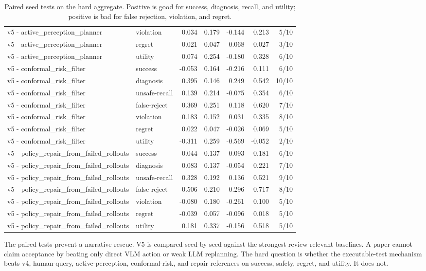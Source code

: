 \documentclass{article}
\begin{document}
\begin{table}[t]
{\begin{tabular}{llrrrrr}
v5 - active\_perception\_planner & violation & 0.034 & 0.179 & -0.144 & 0.213 & 5/10 \\
v5 - active\_perception\_planner & regret & -0.021 & 0.047 & -0.068 & 0.027 & 3/10 \\
v5 - active\_perception\_planner & utility & 0.074 & 0.254 & -0.180 & 0.328 & 6/10 \\
v5 - conformal\_risk\_filter & success & -0.053 & 0.164 & -0.216 & 0.111 & 6/10 \\
v5 - conformal\_risk\_filter & diagnosis & 0.395 & 0.146 & 0.249 & 0.542 & 10/10 \\
v5 - conformal\_risk\_filter & unsafe-recall & 0.139 & 0.214 & -0.075 & 0.354 & 6/10 \\
v5 - conformal\_risk\_filter & false-reject & 0.369 & 0.251 & 0.118 & 0.620 & 7/10 \\
v5 - conformal\_risk\_filter & violation & 0.183 & 0.152 & 0.031 & 0.335 & 8/10 \\
v5 - conformal\_risk\_filter & regret & 0.022 & 0.047 & -0.026 & 0.069 & 5/10 \\
v5 - conformal\_risk\_filter & utility & -0.311 & 0.259 & -0.569 & -0.052 & 2/10 \\
v5 - policy\_repair\_from\_failed\_rollouts & success & 0.044 & 0.137 & -0.093 & 0.181 & 6/10 \\
v5 - policy\_repair\_from\_failed\_rollouts & diagnosis & 0.083 & 0.137 & -0.054 & 0.221 & 7/10 \\
v5 - policy\_repair\_from\_failed\_rollouts & unsafe-recall & 0.328 & 0.192 & 0.136 & 0.521 & 9/10 \\
v5 - policy\_repair\_from\_failed\_rollouts & false-reject & 0.506 & 0.210 & 0.296 & 0.717 & 8/10 \\
v5 - policy\_repair\_from\_failed\_rollouts & violation & -0.080 & 0.180 & -0.261 & 0.100 & 5/10 \\
v5 - policy\_repair\_from\_failed\_rollouts & regret & -0.039 & 0.057 & -0.096 & 0.018 & 5/10 \\
v5 - policy\_repair\_from\_failed\_rollouts & utility & 0.181 & 0.337 & -0.156 & 0.518 & 5/10 \\
\bottomrule
\end{tabular}}
\caption{Paired seed tests on the hard aggregate. Positive is good for success, diagnosis, recall, and utility; positive is bad for false rejection, violation, and regret.}
\label{tab:paired}
\end{table}


The paired tests prevent a narrative rescue. V5 is compared seed-by-seed against the strongest review-relevant baselines. A paper cannot claim acceptance by beating only direct VLM action or weak LLM replanning. The hard question is whether the executable-test mechanism beats v4, human-query, active-perception, conformal-risk, and repair references on success, safety, regret, and utility. It does not.
\end{document}
